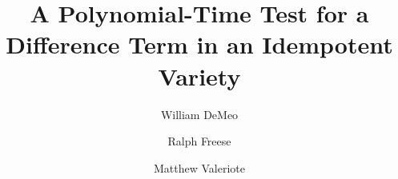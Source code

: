 \usepackage[yyyymmdd,hhmmss]{datetime}
\usepackage{background}


\usepackage{pdfcomment}
\usepackage{color}
\usepackage{amsmath}
\usepackage{amsfonts}
\usepackage{amscd}
\usepackage{inputs/rflatexmacs}
\usepackage{inputs/wjdlatexmacs}

\usepackage[mathcal]{euscript}
\usepackage{comment}

\renewcommand{\th}[2]{#1\mathrel{\theta}#2}
\newcommand{\infixrel}[3]{#2\mathrel{#1}#3}


\newtheorem{theorem}{Theorem}
\newtheorem{lemma}[theorem]{Lemma}
\newtheorem{corollary}[theorem]{Corollary}
\newtheorem{prop}[theorem]{Proposition}
\newtheorem{conjecture}[theorem]{Conjecture}
\theoremstyle{definition}
\newtheorem{example}[theorem]{Example}
\newtheorem{fact}[theorem]{Fact}
\newtheorem{remark}{Remark}
\newtheorem*{remarks}{Remarks}
\newtheorem*{rem}{Remark}
\newtheorem{prob}{Problem}



\title[A Test for a Difference Term]{A Polynomial-Time Test for a
Difference Term in an Idempotent Variety}
\author[W.~DeMeo]{William DeMeo}
\address{University of Colorado\\Mathematics Dept\\Boulder 80309\\USA}

\author[R.~Freese]{Ralph Freese}
\address{University of Hawaii\\Mathematics Dept\\Honolulu 96822\\USA}
\author[M.~Valeriote]{Matthew Valeriote}
\address{McMaster University\\Mathematics Dept\\Hamilton L8S 4K1\\
CAN}

